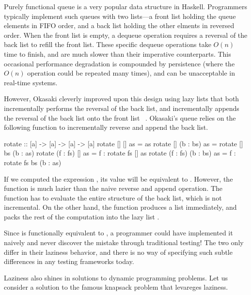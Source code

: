 \documentclass[acmsmall,review]{acmart}\settopmatter{}
\begin{document}

Purely functional queue is a very popular data structure in
Haskell. Programmers typically implement such queues with two
lists---a front list holding the queue elements in FIFO order, and a
back list holding the other elments in reversed order. When the front
list is empty, a dequeue operation requires a reversal of the back
list to refill the front list. These specific dequeue operations take
$O(n)$ time to finish, and are much slower than their imperative
counterparts. This occasional performance degradation is compounded by
persistence (where the $O(n)$ operation could be repeated many times),
and can be unacceptable in real-time systems.

However, Okasaki cleverly improved upon this design using lazy lists
that both incrementally performs the reversal of the back list, and
incrementally appends the reversal of the back list onto the front
list ~\cite{Okasaki95simpleand}. Okasaki's queue relies on the
following  function to incrementally reverse and append the
back list.
\begin{inlinecode}
rotate :: [a] -> [a] -> [a] -> [a]
rotate      []       []  as =                       as
rotate      []  (b : bs) as =     rotate [] bs (b : as)
rotate (f : fs)      []  as = f : rotate fs []      as
rotate (f : fs) (b : bs) as = f : rotate fs bs (b : as)
\end{inlinecode}
If we computed the expression , its value
will be equivalent to . However, the
function  is much lazier than the naive reverse and append
operation. The function  has to evaluate the entire
structure of the back list, which is not incremental. On the other
hand, the function  produces a list immediately, and packs
the rest of the computation into the lazy list .

Since  is functionally equivalent to , a programmer could have implemented it naively and never
discover the mistake through traditional testing! The two only differ
in their laziness behavior, and there is no way of specifying such
subtle differences in any testing frameworks today.


Laziness also shines in solutions to dynamic programming problems. Let
us consider a solution to the famous knapsack problem that levareges
laziness.
\end{document}
